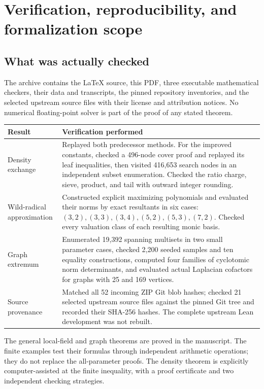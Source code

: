 \section{Verification, reproducibility, and formalization scope}
\label{sec:verification}

\subsection{What was actually checked}
The archive contains the LaTeX source, this PDF, three executable mathematical
checkers, their data and transcripts, the pinned repository inventories, and
the selected upstream source files with their license and attribution notices.
No numerical floating-point solver is part of the proof of any stated theorem.

\begin{center}\small
\begin{tabular}{p{}p{}}
\toprule
Result & Verification performed\\\midrule
Density exchange & Replayed both predecessor methods. For the improved constants,
checked a 496-node cover proof and replayed its leaf inequalities, then visited
416,653 search nodes in an independent subset enumeration. Checked the ratio charge,
sieve, product, and tail with outward integer rounding.\\[4pt]
Wild-radical approximation & Constructed explicit maximizing polynomials and evaluated
their norms by exact resultants in six cases: $(3,2),(3,3),(3,4),(5,2),(5,3),(7,2)$.
Checked every valuation class of each resulting monic basis.\\[4pt]
Graph extremum & Enumerated 19,392 spanning multisets in two small parameter cases,
checked 2,200 seeded samples and ten equality constructions, computed four families
of cyclotomic norm determinants, and evaluated actual Laplacian cofactors for graphs
with 25 and 169 vertices.\\[4pt]
Source provenance & Matched all 52 incoming ZIP Git blob hashes; checked 21 selected
upstream source files against the pinned Git tree and recorded their SHA-256 hashes.
The complete upstream Lean development was not rebuilt.\\\bottomrule
\end{tabular}
\end{center}

The general local-field and graph theorems are proved in the manuscript.
The finite examples test their formulas through independent arithmetic operations;
they do not replace the all-parameter proofs. The density theorem is explicitly
computer-assisted at the finite inequality, with a proof certificate and two
independent checking strategies.

